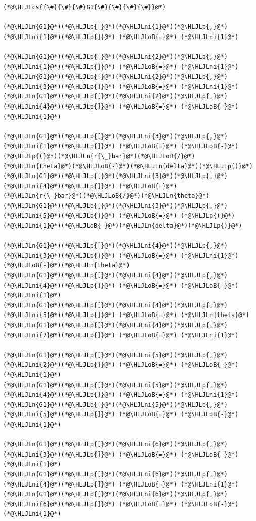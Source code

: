 \documentclass[12pt,a4paper]{article}
\newcommand{\HLJLn}[1]{#1}
\newcommand{\HLJLni}[1]{\textcolor[RGB]{59,151,46}{#1}}
\newcommand{\HLJLoB}[1]{\textcolor[RGB]{102,102,102}{\textbf{#1}}}
\newcommand{\HLJLp}[1]{#1}
\newcommand{\HLJLcs}[1]{\textcolor[RGB]{153,153,119}{\textit{#1}}}
\begin{document}
\begin{lstlisting}
(*@\HLJLcs{{\#}{\#}{\#}G1{\#}{\#}{\#}{\#}}@*)

(*@\HLJLn{G1}@*)(*@\HLJLp{[}@*)(*@\HLJLni{1}@*)(*@\HLJLp{,}@*)(*@\HLJLni{1}@*)(*@\HLJLp{]}@*) (*@\HLJLoB{=}@*) (*@\HLJLni{1}@*)

(*@\HLJLn{G1}@*)(*@\HLJLp{[}@*)(*@\HLJLni{2}@*)(*@\HLJLp{,}@*)(*@\HLJLni{1}@*)(*@\HLJLp{]}@*) (*@\HLJLoB{=}@*) (*@\HLJLni{1}@*)
(*@\HLJLn{G1}@*)(*@\HLJLp{[}@*)(*@\HLJLni{2}@*)(*@\HLJLp{,}@*)(*@\HLJLni{3}@*)(*@\HLJLp{]}@*) (*@\HLJLoB{=}@*) (*@\HLJLni{1}@*)
(*@\HLJLn{G1}@*)(*@\HLJLp{[}@*)(*@\HLJLni{2}@*)(*@\HLJLp{,}@*)(*@\HLJLni{4}@*)(*@\HLJLp{]}@*) (*@\HLJLoB{=}@*) (*@\HLJLoB{-}@*)(*@\HLJLni{1}@*)

(*@\HLJLn{G1}@*)(*@\HLJLp{[}@*)(*@\HLJLni{3}@*)(*@\HLJLp{,}@*)(*@\HLJLni{1}@*)(*@\HLJLp{]}@*) (*@\HLJLoB{=}@*) (*@\HLJLoB{-}@*)(*@\HLJLp{(}@*)(*@\HLJLn{r{\_}bar}@*)(*@\HLJLoB{/}@*)(*@\HLJLn{theta}@*)(*@\HLJLoB{-}@*)(*@\HLJLn{delta}@*)(*@\HLJLp{)}@*)
(*@\HLJLn{G1}@*)(*@\HLJLp{[}@*)(*@\HLJLni{3}@*)(*@\HLJLp{,}@*)(*@\HLJLni{4}@*)(*@\HLJLp{]}@*) (*@\HLJLoB{=}@*) (*@\HLJLn{r{\_}bar}@*)(*@\HLJLoB{/}@*)(*@\HLJLn{theta}@*)
(*@\HLJLn{G1}@*)(*@\HLJLp{[}@*)(*@\HLJLni{3}@*)(*@\HLJLp{,}@*)(*@\HLJLni{5}@*)(*@\HLJLp{]}@*) (*@\HLJLoB{=}@*) (*@\HLJLp{(}@*)(*@\HLJLni{1}@*)(*@\HLJLoB{-}@*)(*@\HLJLn{delta}@*)(*@\HLJLp{)}@*)

(*@\HLJLn{G1}@*)(*@\HLJLp{[}@*)(*@\HLJLni{4}@*)(*@\HLJLp{,}@*)(*@\HLJLni{3}@*)(*@\HLJLp{]}@*) (*@\HLJLoB{=}@*) (*@\HLJLni{1}@*)(*@\HLJLoB{-}@*)(*@\HLJLn{theta}@*)
(*@\HLJLn{G1}@*)(*@\HLJLp{[}@*)(*@\HLJLni{4}@*)(*@\HLJLp{,}@*)(*@\HLJLni{4}@*)(*@\HLJLp{]}@*) (*@\HLJLoB{=}@*) (*@\HLJLoB{-}@*)(*@\HLJLni{1}@*)
(*@\HLJLn{G1}@*)(*@\HLJLp{[}@*)(*@\HLJLni{4}@*)(*@\HLJLp{,}@*)(*@\HLJLni{5}@*)(*@\HLJLp{]}@*) (*@\HLJLoB{=}@*) (*@\HLJLn{theta}@*)
(*@\HLJLn{G1}@*)(*@\HLJLp{[}@*)(*@\HLJLni{4}@*)(*@\HLJLp{,}@*)(*@\HLJLni{7}@*)(*@\HLJLp{]}@*) (*@\HLJLoB{=}@*) (*@\HLJLni{1}@*)

(*@\HLJLn{G1}@*)(*@\HLJLp{[}@*)(*@\HLJLni{5}@*)(*@\HLJLp{,}@*)(*@\HLJLni{2}@*)(*@\HLJLp{]}@*) (*@\HLJLoB{=}@*) (*@\HLJLoB{-}@*)(*@\HLJLni{1}@*)
(*@\HLJLn{G1}@*)(*@\HLJLp{[}@*)(*@\HLJLni{5}@*)(*@\HLJLp{,}@*)(*@\HLJLni{4}@*)(*@\HLJLp{]}@*) (*@\HLJLoB{=}@*) (*@\HLJLni{1}@*)
(*@\HLJLn{G1}@*)(*@\HLJLp{[}@*)(*@\HLJLni{5}@*)(*@\HLJLp{,}@*)(*@\HLJLni{5}@*)(*@\HLJLp{]}@*) (*@\HLJLoB{=}@*) (*@\HLJLoB{-}@*)(*@\HLJLni{1}@*)

(*@\HLJLn{G1}@*)(*@\HLJLp{[}@*)(*@\HLJLni{6}@*)(*@\HLJLp{,}@*)(*@\HLJLni{3}@*)(*@\HLJLp{]}@*) (*@\HLJLoB{=}@*) (*@\HLJLoB{-}@*)(*@\HLJLni{1}@*)
(*@\HLJLn{G1}@*)(*@\HLJLp{[}@*)(*@\HLJLni{6}@*)(*@\HLJLp{,}@*)(*@\HLJLni{4}@*)(*@\HLJLp{]}@*) (*@\HLJLoB{=}@*) (*@\HLJLni{1}@*)
(*@\HLJLn{G1}@*)(*@\HLJLp{[}@*)(*@\HLJLni{6}@*)(*@\HLJLp{,}@*)(*@\HLJLni{6}@*)(*@\HLJLp{]}@*) (*@\HLJLoB{=}@*) (*@\HLJLoB{-}@*)(*@\HLJLni{1}@*)


\end{lstlisting}
\end{document}
